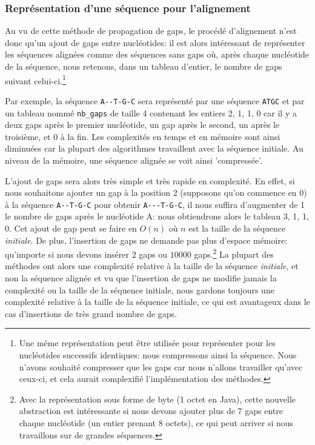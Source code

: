 \subsubsection{Représentation d'une séquence pour l'alignement}
\label{subsubsection:repr_sequence_alignment}

Au vu de cette méthode de propagation de gaps, le procédé d'alignement n'est
donc qu'un ajout de gaps entre nucléotides: il est alors intéressant de
représenter les séquences alignées comme des séquences sans gaps où, après
chaque nucléotide de la séquence, nous retenons, dans un tableau d'entier, le
nombre de gaps suivant celui-ci.\footnote{Une même représentation peut être
	utilisée pour représenter pour les nucléotides successifs identiques: nous
	compressons ainsi la séquence. Nous n'avons souhaité compresser que les gaps
	car nous n'allons travailler qu'avec ceux-ci, et cela aurait complexifié
l'implémentation des méthodes.}

Par exemple, la séquence \verb|A--T-G-C| sera représenté par une séquence
\verb|ATGC| et par un tableau nommé \verb|nb_gaps| de taille 4
contenant les entiers {2, 1, 1, 0} car il y a deux gaps après le premier
nucléotide, un gap après le second, un après le troisième, et 0 à la fin. Les
complexités en temps et en mémoire sont ainsi diminuées car la plupart des
algorithmes travaillent avec la séquence initiale.
Au niveau de la mémoire, une séquence alignée se voit ainsi 'compressée'.

L'ajout de gaps sera alors très simple et très rapide en complexité. En effet,
si nous souhaitons ajouter un gap à la position 2 (supposons qu'on commence en
0) à la séquence \verb|A--T-G-C| pour obtenir \verb|A---T-G-C|, il nous suffira
d'augmenter de 1 le nombre de gaps après le nucléotide A: nous obtiendrons alors
le tableau {3, 1, 1, 0}. Cet ajout de gap peut se faire en $O(n)$ où $n$ est la
taille de la séquence \textit{initiale}. De plus, l'insertion de gaps ne demande
pas plus d'espace mémoire: qu'importe si nous devons insérer $2$ gaps ou $10000$
gaps.\footnote{Avec la représentation sous forme de byte (1 octet en Java),
	cette nouvelle abstraction est intéressante si nous devons ajouter plus de 7
	gaps entre chaque nucléotide (un entier prenant 8 octets), ce qui peut
arriver si nous travaillons sur de grandes séquences.}
La plupart des méthodes ont alors une complexité relative à la taille de la
séquence \textit{initiale}, et non la séquence alignée et vu que l'insertion de
gaps ne modifie jamais la complexité ou la taille de la séquence initiale, nous
gardons toujours une complexité relative à la taille de la séquence initiale, ce
qui est avantageux dans le cas d'insertions de très grand nombre de gaps.

